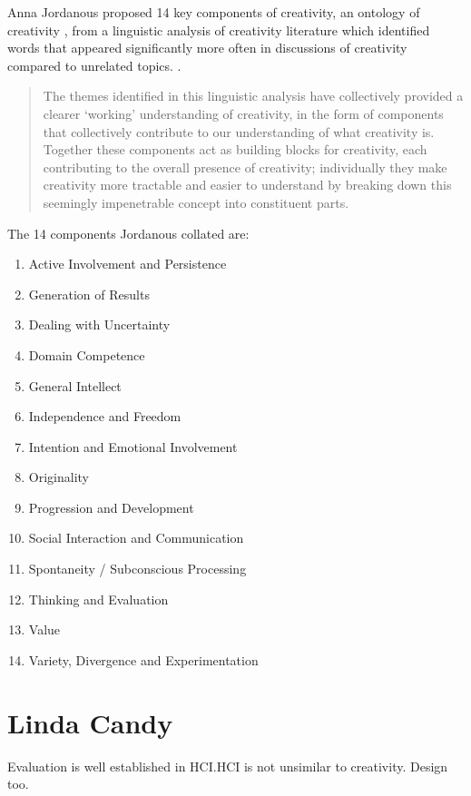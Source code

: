 Anna Jordanous proposed 14 key components of creativity, an ontology of creativity \citeyear[p.104-120]{Jordanous2012}, from a linguistic analysis of creativity literature which identified words that appeared significantly more often in discussions of creativity compared to unrelated topics. \citeyear[p.120]{Jordanous2012}.

\begin{quote}
  The themes identified in this linguistic analysis have collectively provided a clearer ‘working’ understanding of creativity, in the form of components that collectively contribute to our understanding of what creativity is. Together these components act as building blocks for creativity, each contributing to the overall presence of creativity; individually they make creativity more tractable and easier to understand by breaking down this seemingly impenetrable concept into constituent parts. \parencite[p.120]{Jordanous2012}
\end{quote}

The 14 components Jordanous collated are: \citeyear[p.118-120]{Jordanous2012}
\begin{enumerate}
  \item Active Involvement and Persistence
  \item Generation of Results
  \item Dealing with Uncertainty
  \item Domain Competence
  \item General Intellect
  \item Independence and Freedom
  \item Intention and Emotional Involvement
  \item Originality
  \item Progression and Development
  \item Social Interaction and Communication
  \item Spontaneity / Subconscious Processing
  \item Thinking and Evaluation
  \item Value
  \item Variety, Divergence and Experimentation
\end{enumerate}


\section{Linda Candy}

Evaluation is well established in HCI.\@ HCI is not unsimilar to creativity. Design too.

